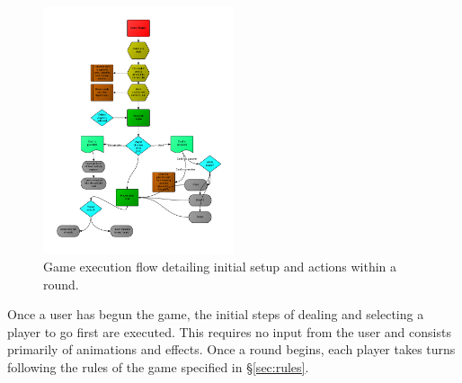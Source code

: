 \documentclass[12pt]{IEEEtran}
\begin{document}
	\begin{figure}[h]
		\centering
		\includegraphics[width=0.5\textwidth]{gameplay.png}
		\caption{Game execution flow detailing initial setup and actions within a round. }
		\label{fig:gameplay}
	\end{figure}

	Once a user has begun the game, the initial steps of dealing and selecting a player to go first are executed. This requires no input from the user and consists primarily of animations and effects. Once a round begins, each player takes turns following the rules of the game specified in \S\ref{sec:rules}. 
\end{document}
